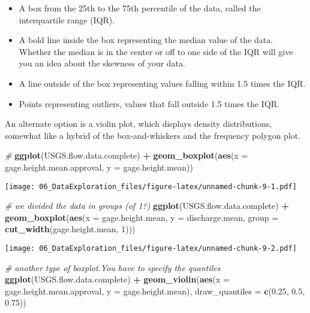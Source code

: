 \documentclass[]{article}
\newenvironment{Shaded}{\begin{snugshade}}{\end{snugshade}}
\newcommand{\KeywordTok}[1]{\textcolor[rgb]{0.13,0.29,0.53}{\textbf{#1}}}
\newcommand{\DataTypeTok}[1]{\textcolor[rgb]{0.13,0.29,0.53}{#1}}
\newcommand{\DecValTok}[1]{\textcolor[rgb]{0.00,0.00,0.81}{#1}}
\newcommand{\FloatTok}[1]{\textcolor[rgb]{0.00,0.00,0.81}{#1}}
\newcommand{\StringTok}[1]{\textcolor[rgb]{0.31,0.60,0.02}{#1}}
\newcommand{\CommentTok}[1]{\textcolor[rgb]{0.56,0.35,0.01}{\textit{#1}}}
\newcommand{\OperatorTok}[1]{\textcolor[rgb]{0.81,0.36,0.00}{\textbf{#1}}}
\newcommand{\NormalTok}[1]{#1}
\begin{document}
\begin{itemize}
\item
  A box from the 25th to the 75th percentile of the data, called the
  interquartile range (IQR).
\item
  A bold line inside the box representing the median value of the data.
  Whether the median is in the center or off to one side of the IQR will
  give you an idea about the skewness of your data.
\item
  A line outside of the box representing values falling within 1.5 times
  the IQR.
\item
  Points representing outliers, values that fall outside 1.5 times the
  IQR.
\end{itemize}

An alternate option is a violin plot, which displays density
distributions, somewhat like a hybrid of the box-and-whiskers and the
frequency polygon plot.

\begin{Shaded}
\begin{Highlighting}[]
\CommentTok{#}
\KeywordTok{ggplot}\NormalTok{(USGS.flow.data.complete) }\OperatorTok{+}
\StringTok{  }\KeywordTok{geom_boxplot}\NormalTok{(}\KeywordTok{aes}\NormalTok{(}\DataTypeTok{x =}\NormalTok{ gage.height.mean.approval, }\DataTypeTok{y =}\NormalTok{ gage.height.mean))}
\end{Highlighting}
\end{Shaded}

\texttt{[image: 06\_DataExploration\_files/figure-latex/unnamed-chunk-9-1.pdf]}

\begin{Shaded}
\begin{Highlighting}[]
\CommentTok{# we divided the data in groups (of 1?)}
\KeywordTok{ggplot}\NormalTok{(USGS.flow.data.complete) }\OperatorTok{+}
\StringTok{  }\KeywordTok{geom_boxplot}\NormalTok{(}\KeywordTok{aes}\NormalTok{(}\DataTypeTok{x =}\NormalTok{ gage.height.mean, }\DataTypeTok{y =}\NormalTok{ discharge.mean, }\DataTypeTok{group =} \KeywordTok{cut_width}\NormalTok{(gage.height.mean, }\DecValTok{1}\NormalTok{)))}
\end{Highlighting}
\end{Shaded}

\texttt{[image: 06\_DataExploration\_files/figure-latex/unnamed-chunk-9-2.pdf]}

\begin{Shaded}
\begin{Highlighting}[]
\CommentTok{# another type of boxplot.You have to specify the quantiles}
\KeywordTok{ggplot}\NormalTok{(USGS.flow.data.complete) }\OperatorTok{+}
\StringTok{  }\KeywordTok{geom_violin}\NormalTok{(}\KeywordTok{aes}\NormalTok{(}\DataTypeTok{x =}\NormalTok{ gage.height.mean.approval, }\DataTypeTok{y =}\NormalTok{ gage.height.mean), }\DataTypeTok{draw_quantiles =} \KeywordTok{c}\NormalTok{(}\FloatTok{0.25}\NormalTok{, }\FloatTok{0.5}\NormalTok{, }\FloatTok{0.75}\NormalTok{))}
\end{Highlighting}
\end{Shaded}
\end{document}
